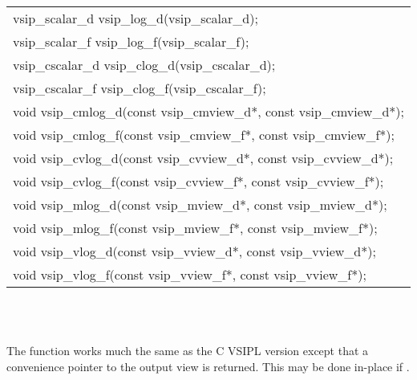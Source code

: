 \\\cvsiplh
\afh
\\\hspace*{.04\textwidth} {
\ttfamily
\begin{tabular}[H]{l}
vsip\_scalar\_d vsip\_log\_d(vsip\_scalar\_d);\\
vsip\_scalar\_f vsip\_log\_f(vsip\_scalar\_f);\\
vsip\_cscalar\_d vsip\_clog\_d(vsip\_cscalar\_d);\\
vsip\_cscalar\_f vsip\_clog\_f(vsip\_cscalar\_f);\\
void vsip\_cmlog\_d(const vsip\_cmview\_d*, const vsip\_cmview\_d*);\\
void vsip\_cmlog\_f(const vsip\_cmview\_f*, const vsip\_cmview\_f*);\\
void vsip\_cvlog\_d(const vsip\_cvview\_d*, const vsip\_cvview\_d*);\\
void vsip\_cvlog\_f(const vsip\_cvview\_f*, const vsip\_cvview\_f*);\\
void vsip\_mlog\_d(const vsip\_mview\_d*, const vsip\_mview\_d*);\\
void vsip\_mlog\_f(const vsip\_mview\_f*, const vsip\_mview\_f*);\\
void vsip\_vlog\_d(const vsip\_vview\_d*, const vsip\_vview\_d*);\\
void vsip\_vlog\_f(const vsip\_vview\_f*, const vsip\_vview\_f*);\\
\end{tabular}
}
\\\pyjvsiph
{}
\\\hspace*{1.2cm}\parbox{10.8cm}{\vspace*{.1cm}The  function works much the same as the C VSIPL version except that a convenience pointer to the output view is returned. This may be done in-place if .}
